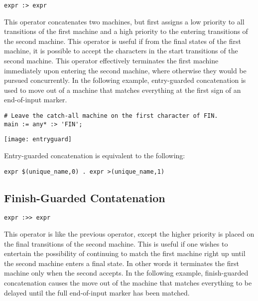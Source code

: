 \documentclass[letterpaper,11pt,oneside]{book}
\newcommand{\verbspace}{\vspace{10pt}}
\newenvironment{inline_code}{\def\baselinestretch{1}\vspace{12pt}\small}{}
\begin{document}
\verb|expr :> expr| 
\verbspace

This operator concatenates two machines, but first assigns a low
priority to all transitions
of the first machine and a high priority to the entering transitions of the
second machine. This operator is useful if from the final states of the first
machine, it is possible to accept the characters in the start transitions of
the second machine. This operator effectively terminates the first machine
immediately upon entering the second machine, where otherwise they would be
pursued concurrently. In the following example, entry-guarded concatenation is
used to move out of a machine that matches everything at the first sign of an
end-of-input marker.

\begin{inline_code}
\begin{verbatim}
# Leave the catch-all machine on the first character of FIN.
main := any* :> 'FIN';
\end{verbatim}
\end{inline_code}

\begin{center}
\texttt{[image: entryguard]}
\end{center}


Entry-guarded concatenation is equivalent to the following:

\verbspace
\begin{verbatim}
expr $(unique_name,0) . expr >(unique_name,1)
\end{verbatim}

\subsection{Finish-Guarded Contatenation}

\verb|expr :>> expr|
\verbspace

This operator is
like the previous operator, except the higher priority is placed on the final
transitions of the second machine. This is useful if one wishes to entertain
the possibility of continuing to match the first machine right up until the
second machine enters a final state. In other words it terminates the first
machine only when the second accepts. In the following example, finish-guarded
concatenation causes the move out of the machine that matches everything to be
delayed until the full end-of-input marker has been matched.
\end{document}
